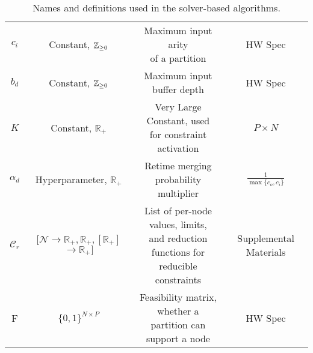 \begin{table*}
\begin{tabularx}{\textwidth}{cccc}
    $c_i$ & Constant, $\mathbb{Z}_{\ge 0}$ & \ccell{Maximum input arity\\ of a partition} & HW Spec \\[0.5cm]
    $b_d$ & Constant, $\mathbb{Z}_{\ge 0}$ & \ccell{Maximum input\\ buffer depth} & HW Spec \\[0.5cm]
    $K$ & Constant, $\mathbb{R}_+$ & \ccell{Very Large Constant, used\\ for constraint activation} & $P \times N$ \\[0.5cm]
    $\alpha_d$ & Hyperparameter, $\mathbb{R}_+$ & \ccell{Retime merging\\ probability multiplier}& $\frac{1}{\max\{c_o, c_i\}}$ \\[0.5cm]
    $\mathcal{C}_r$& \ccell{$[\mathcal{N} \to \mathbb{R}_+,\mathbb{R}_+, [\mathbb{R}_+]$\\$ \to \mathbb{R}_+]$} & 
    \ccell{List of per-node values, limits,\\ and reduction functions for\\ reducible constraints}& Supplemental Materials\\[0.7cm]

    F & $\{0, 1\}^{N \times P}$ & \ccell{Feasibility matrix, whether a\\ partition can support a node}& HW Spec \\ 
    \bottomrule
  \end{tabularx}
  \caption{Names and definitions used in the solver-based algorithms.}
  \label{tab:solver-variables}
\end{table*}


